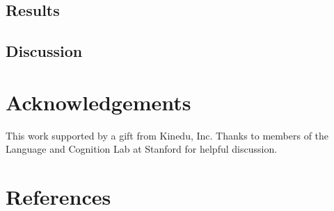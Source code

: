 \documentclass[10pt, letterpaper]{article}
\begin{document}
\subsection{Results}\label{results}

\subsection{Discussion}\label{discussion}

\section{Acknowledgements}\label{acknowledgements}

This work supported by a gift from Kinedu, Inc. Thanks to members of the
Language and Cognition Lab at Stanford for helpful discussion.

\section{References}\label{references}

\small
\end{document}
